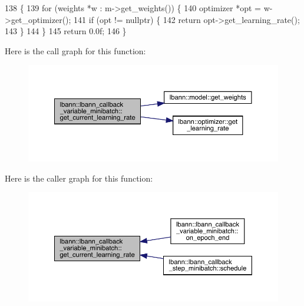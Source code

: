 \begin{DoxyCode}
138                   \{
139   \textcolor{keywordflow}{for} (weights *w : m->get\_weights()) \{
140     optimizer *opt = w->get\_optimizer();
141     \textcolor{keywordflow}{if} (opt != \textcolor{keyword}{nullptr}) \{
142       \textcolor{keywordflow}{return} opt->get\_learning\_rate();
143     \}
144   \}
145   \textcolor{keywordflow}{return} 0.0f;
146 \}
\end{DoxyCode}
Here is the call graph for this function\+:\nopagebreak
\begin{figure}[H]
\begin{center}
\leavevmode
\includegraphics[width=350pt]{classlbann_1_1lbann__callback__variable__minibatch_a9de892c44231eadbbc7d27cfcc340ce2_cgraph}
\end{center}
\end{figure}
Here is the caller graph for this function\+:\nopagebreak
\begin{figure}[H]
\begin{center}
\leavevmode
\includegraphics[width=350pt]{classlbann_1_1lbann__callback__variable__minibatch_a9de892c44231eadbbc7d27cfcc340ce2_icgraph}
\end{center}
\end{figure}
\mbox{\label{classlbann_1_1lbann__callback__variable__minibatch_a091e7563b5a7a90638e2521fe39cbf8f}} 
